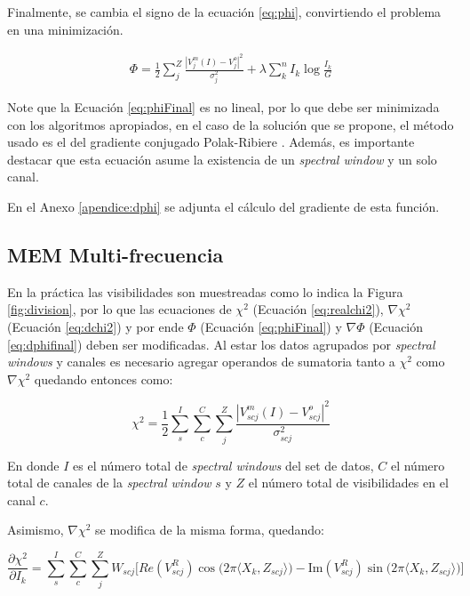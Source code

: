 Finalmente, se cambia el signo de la ecuación \ref{eq:phi}, convirtiendo el problema en una minimización.

\begin{align}
\label{eq:phiFinal}
 \Phi = \frac{1}{2}\sum_j^{Z}{{\frac{|V^m_j(I)-V^o_j|^2}{\sigma_j^2}} + \lambda \sum_k^{n}{I_k \log{\frac{I_k}{G}}}}
\end{align}


Note que la Ecuación \ref{eq:phiFinal} es no lineal, por lo que debe ser minimizada con los algoritmos apropiados, en el caso de la solución que se propone, el método usado es el del gradiente conjugado Polak-Ribiere \citep{polak}. Además, es importante destacar que esta ecuación asume la existencia de un \textit{spectral window} y un solo canal.

En el Anexo \ref{apendice:dphi} se adjunta el cálculo del gradiente de esta función.

\subsection{MEM Multi-frecuencia}

En la práctica las visibilidades son muestreadas como lo indica la Figura \ref{fig:division}, por lo que las ecuaciones de $\chi^{2}$ (Ecuación \ref{eq:realchi2}), $\nabla \chi^{2}$ (Ecuación \ref{eq:dchi2}) y por ende $\Phi$ (Ecuación \ref{eq:phiFinal}) y $\nabla \Phi$ (Ecuación \ref{eq:dphifinal}) deben ser modificadas. Al estar los datos agrupados por \textit{spectral windows} y canales es necesario agregar operandos de sumatoria tanto a $\chi^{2}$ como $\nabla \chi^{2}$ quedando entonces como:

\begin{equation}
  \chi^{2} = \frac{1}{2}\sum_{s}^{I}\sum_{c}^{C}\sum_{j}^{Z}\frac{|V^m_{scj}(I)-V^o_{scj}|^2}{\sigma_{scj}^2}
  \label{eq:chi2-multi}
\end{equation}

En donde $I$ es el número total de \textit{spectral windows} del set de datos, $C$ el número total de canales de la \textit{spectral window} $s$ y $Z$ el número total de visibilidades en el canal $c$.

Asimismo, $\nabla \chi^{2}$ se modifica de la misma forma, quedando:

\begin{equation}
\frac{\partial\chi^{2}}{\partial I_{k}} = \sum_{s}^{I}\sum_{c}^{C}\sum_{j}^{Z} W_{scj}\biggl[Re(V_{scj}^{R})\cos\bigl(2\pi \langle X_k,Z_{scj}\rangle\bigr)-\text{Im}(V_{scj}^{R})\sin\bigl(2\pi \langle X_k,Z_{scj}\rangle\bigr)\biggr]
\label{eq:dchi2-multi}
\end{equation}


